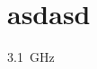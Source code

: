 \documentclass[./top_with_subfile.tex]{subfiles}
\begin{document}
\section{asdasd}
\qty{3.1}{\GHz}
\end{document}
